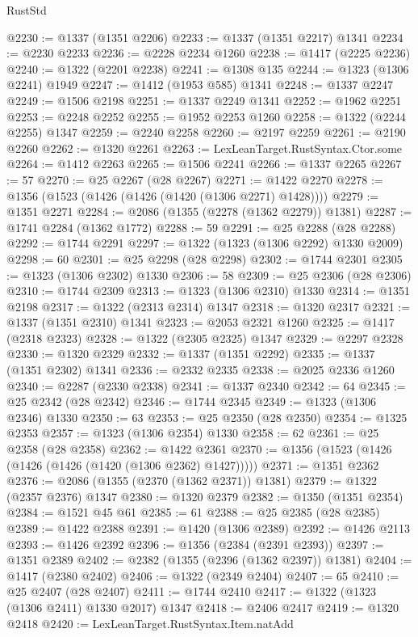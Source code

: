 \begin{lexlean}{RustStd}
\begin{coremodule}
@2230 := @1337 (@1351 @2206)
@2233 := @1337 (@1351 @2217) @1341
@2234 := @2230 @2233
@2236 := @2228 @2234 @1260
@2238 := @1417 (@2225 @2236)
@2240 := @1322 (@2201 @2238)
@2241 := @1308 @135
@2244 := @1323 (@1306 @2241) @1949
@2247 := @1412 (@1953 @585) @1341
@2248 := @1337 @2247
@2249 := @1506 @2198
@2251 := @1337 @2249 @1341
@2252 := @1962 @2251
@2253 := @2248 @2252
@2255 := @1952 @2253 @1260
@2258 := @1322 (@2244 @2255) @1347
@2259 := @2240 @2258
@2260 := @2197 @2259
@2261 := @2190 @2260
@2262 := @1320 @2261
@2263 := LexLeanTarget.RustSyntax.Ctor.some
@2264 := @1412 @2263
@2265 := @1506 @2241
@2266 := @1337 @2265
@2267 := 57
@2270 := @25 @2267 (@28 @2267)
@2271 := @1422 @2270
@2278 := @1356 (@1523 (@1426 (@1426 (@1420 (@1306 @2271) @1428))))
@2279 := @1351 @2271
@2284 := @2086 (@1355 (@2278 (@1362 @2279)) @1381)
@2287 := @1741 @2284 (@1362 @1772)
@2288 := 59
@2291 := @25 @2288 (@28 @2288)
@2292 := @1744 @2291
@2297 := @1322 (@1323 (@1306 @2292) @1330 @2009)
@2298 := 60
@2301 := @25 @2298 (@28 @2298)
@2302 := @1744 @2301
@2305 := @1323 (@1306 @2302) @1330
@2306 := 58
@2309 := @25 @2306 (@28 @2306)
@2310 := @1744 @2309
@2313 := @1323 (@1306 @2310) @1330
@2314 := @1351 @2198
@2317 := @1322 (@2313 @2314) @1347
@2318 := @1320 @2317
@2321 := @1337 (@1351 @2310) @1341
@2323 := @2053 @2321 @1260
@2325 := @1417 (@2318 @2323)
@2328 := @1322 (@2305 @2325) @1347
@2329 := @2297 @2328
@2330 := @1320 @2329
@2332 := @1337 (@1351 @2292)
@2335 := @1337 (@1351 @2302) @1341
@2336 := @2332 @2335
@2338 := @2025 @2336 @1260
@2340 := @2287 (@2330 @2338)
@2341 := @1337 @2340
@2342 := 64
@2345 := @25 @2342 (@28 @2342)
@2346 := @1744 @2345
@2349 := @1323 (@1306 @2346) @1330
@2350 := 63
@2353 := @25 @2350 (@28 @2350)
@2354 := @1325 @2353
@2357 := @1323 (@1306 @2354) @1330
@2358 := 62
@2361 := @25 @2358 (@28 @2358)
@2362 := @1422 @2361
@2370 := @1356 (@1523 (@1426 (@1426 (@1426 (@1420 (@1306 @2362) @1427)))))
@2371 := @1351 @2362
@2376 := @2086 (@1355 (@2370 (@1362 @2371)) @1381)
@2379 := @1322 (@2357 @2376) @1347
@2380 := @1320 @2379
@2382 := @1350 (@1351 @2354)
@2384 := @1521 @45 @61
@2385 := 61
@2388 := @25 @2385 (@28 @2385)
@2389 := @1422 @2388
@2391 := @1420 (@1306 @2389)
@2392 := @1426 @2113
@2393 := @1426 @2392
@2396 := @1356 (@2384 (@2391 @2393))
@2397 := @1351 @2389
@2402 := @2382 (@1355 (@2396 (@1362 @2397)) @1381)
@2404 := @1417 (@2380 @2402)
@2406 := @1322 (@2349 @2404)
@2407 := 65
@2410 := @25 @2407 (@28 @2407)
@2411 := @1744 @2410
@2417 := @1322 (@1323 (@1306 @2411) @1330 @2017) @1347
@2418 := @2406 @2417
@2419 := @1320 @2418
@2420 := LexLeanTarget.RustSyntax.Item.natAdd

\end{coremodule}
\end{lexlean}
